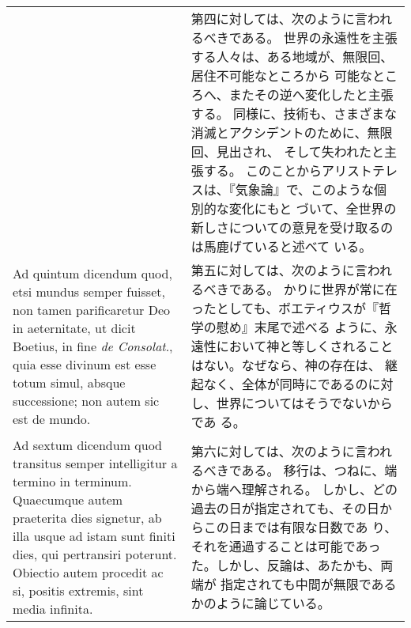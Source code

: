 \documentclass[10pt]{jsarticle} %
\begin{document}
\begin{longtable}{p{21em}p{21em}}
&
第四に対しては、次のように言われるべきである。
世界の永遠性を主張する人々は、ある地域が、無限回、居住不可能なところから
 可能なところへ、またその逆へ変化したと主張する。
同様に、技術も、さまざまな消滅とアクシデントのために、無限回、見出され、
 そして失われたと主張する。
このことからアリストテレスは、『気象論』で、このような個別的な変化にもと
 づいて、全世界の新しさについての意見を受け取るのは馬鹿げていると述べて
 いる。


\\


{\sc Ad quintum dicendum} quod, etsi mundus semper fuisset, non tamen
 parificaretur Deo in aeternitate, ut dicit Boetius, in fine {\it de
 Consolat}., quia esse divinum est esse totum simul, absque successione;
 non autem sic est de mundo.

&
第五に対しては、次のように言われるべきである。
かりに世界が常に在ったとしても、ボエティウスが『哲学の慰め』末尾で述べる
 ように、永遠性において神と等しくされることはない。なぜなら、神の存在は、
 継起なく、全体が同時にであるのに対し、世界についてはそうでないからであ
 る。


\\


{\sc Ad sextum dicendum} quod transitus semper intelligitur a termino in
 terminum. Quaecumque autem praeterita dies signetur, ab illa usque ad
 istam sunt finiti dies, qui pertransiri poterunt. Obiectio autem
 procedit ac si, positis extremis, sint media infinita.

&

第六に対しては、次のように言われるべきである。
移行は、つねに、端から端へ理解される。
しかし、どの過去の日が指定されても、その日からこの日までは有限な日数であ
 り、それを通過することは可能であった。しかし、反論は、あたかも、両端が
 指定されても中間が無限であるかのように論じている。

\\



\end{longtable}
\end{document}
